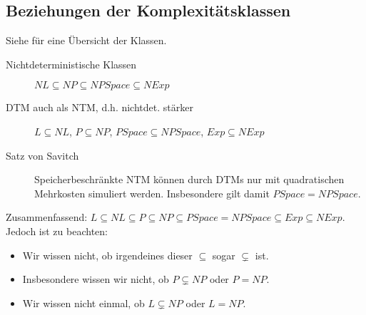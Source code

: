 \subsection{Beziehungen der Komplexitätsklassen}
    Siehe  für eine Übersicht der Klassen. 
    \begin{description}
        \item[Nichtdeterministische Klassen] $NL \subseteq NP \subseteq NPSpace \subseteq NExp$
        \item[DTM auch als NTM, d.h. nichtdet. stärker] $L \subseteq NL$, $P \subseteq NP$, $\mathit{PSpace} \subseteq \mathit{NPSpace}$, $Exp \subseteq NExp$
        \item[Satz von Savitch] Speicherbeschränkte NTM können durch DTMs nur mit  quadratischen Mehrkosten simuliert werden. Insbesondere gilt damit $\mathit{PSpace} = \mathit{NPSpace}$.
    \end{description}

    Zusammenfassend: $L \subseteq NL \subseteq P \subseteq NP \subseteq \mathit{PSpace} = \mathit{NPSpace} \subseteq Exp \subseteq NExp$. \\
    Jedoch ist zu beachten:

    \begin{itemize}
        \setlength\itemsep{0em}
        \item Wir wissen nicht, ob irgendeines dieser $\subseteq$ sogar $\subsetneq$ ist.
        \item Insbesondere wissen wir nicht, ob $P \subsetneq NP$ oder $P = NP$.
        \item Wir wissen nicht einmal, ob $L \subsetneq NP$ oder $L = NP$.
    \end{itemize}


